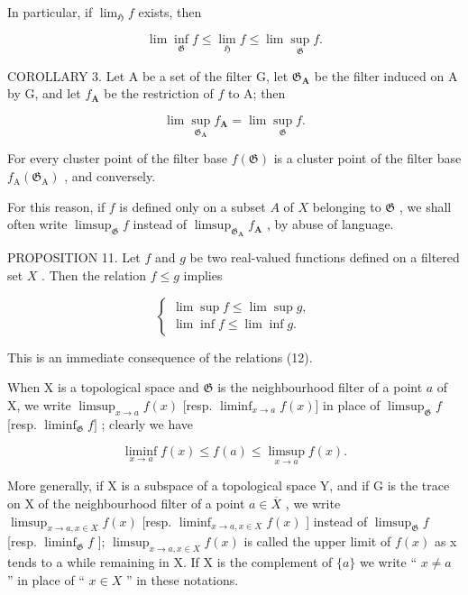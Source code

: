 In particular, if \(\lim_{\mathfrak{H}}f\) exists, then

\[
\lim \inf _ {\mathfrak {G}} f \leqslant \lim _ {\mathfrak {H}} f \leqslant \lim \sup _ {\mathfrak {G}} f.
\]

COROLLARY 3. Let A be a set of the filter G, let \(\mathfrak{G}_{\mathbf{A}}\) be the filter induced on A by G, and let \(f_{\mathbf{A}}\) be the restriction of \(f\) to A; then

\[
\lim \sup _ {\mathfrak {G} _ {\mathbf {A}}} f _ {\mathbf {A}} = \lim \sup _ {\mathfrak {G}} f.
\]

For every cluster point of the filter base \(f(\mathfrak{G})\) is a cluster point of the filter base \(f_{\mathrm{A}}(\mathfrak{G}_{\mathrm{A}})\) , and conversely.

For this reason, if \(f\) is defined only on a subset \(A\) of \(X\) belonging to \(\mathfrak{G}\) , we shall often write \(\limsup_{\mathfrak{G}} f\) instead of \(\limsup_{\mathfrak{G}_{\mathbf{A}}} f_{\mathbf{A}}\) , by abuse of language.

PROPOSITION 11. Let \(f\) and \(g\) be two real-valued functions defined on a filtered set \(X\) . Then the relation \(f \leqslant g\) implies

\[
\left\{ \begin{array}{l} \lim \sup f \leqslant \lim \sup g, \\ \lim \inf f \leqslant \lim \inf g. \end{array} \right.\tag{14}
\]

This is an immediate consequence of the relations (12).

When X is a topological space and \(\mathfrak{G}\) is the neighbourhood filter of a point \(a\) of X, we write \(\limsup_{x\to a}f(x)\) {[}resp. \(\liminf_{x\to a}f(x)]\) in place of \(\limsup_{\mathfrak{G}}f\) {[}resp. \(\liminf_{\mathfrak{G}}f]\) ; clearly we have

\[
\liminf _ {x \to a} f (x) \leqslant f (a) \leqslant \limsup _ {x \to a} f (x).\tag{15}
\]

More generally, if X is a subspace of a topological space Y, and if G is the trace on X of the neighbourhood filter of a point \(a \in \overline{X}\) , we write \(\limsup_{x \to a, x \in X} f(x)\) {[}resp. \(\liminf_{x \to a, x \in X} f(x)\) {]} instead of \(\limsup_{\mathfrak{G}} f\) {[}resp. \(\liminf_{\mathfrak{G}} f\) {]}; \(\limsup_{x \to a, x \in X} f(x)\) is called the upper limit of \(f(x)\) as x tends to a while remaining in X. If X is the complement of \(\{a\}\) we write `` \(x \neq a\) '' in place of `` \(x \in X\) '' in these notations.

